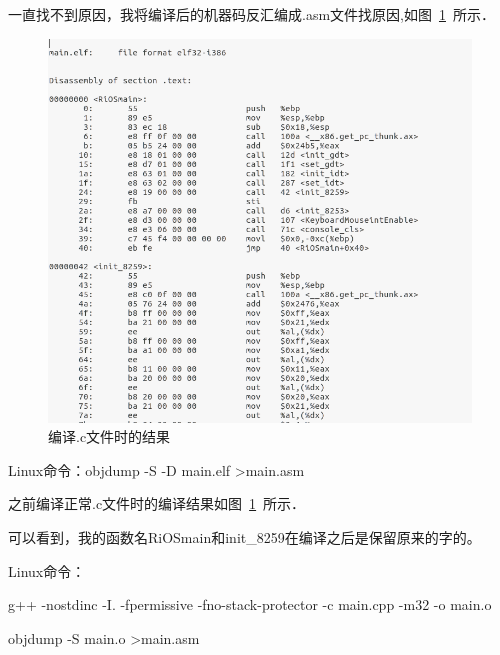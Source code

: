 一直找不到原因，我将编译后的机器码反汇编成.asm文件找原因,如图~\ref{problem01_2}~所示．	

\begin{figure}[!htbp]
		\centering	\includegraphics[width=14cm]{pic/assets/problems/problem01_2}
        \caption{编译.c文件时的结果}	\label{problem01_2}	\end{figure}
        
Linux命令：objdump -S -D main.elf >main.asm
              
之前编译正常.c文件时的编译结果如图~\ref{problem01_2}~所示．	


可以看到，我的函数名RiOSmain和init\_8259在编译之后是保留原来的字的。

Linux命令：

g++  -nostdinc -I.  -fpermissive -fno-stack-protector -c main.cpp -m32 -o main.o

objdump -S main.o >main.asm


